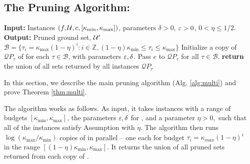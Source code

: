 \subsection{The Pruning Algorithm: \qs} \label{sec:prune-multi} 
\begin{algorithm}[t]
	\caption{\qs: The Pruning Algorithm.}
	\begin{algorithmic}[1] \label{alg:multi}
          \STATE \textbf{Input:} Instances $(f, \mathcal{U}, c, [\kappa_{\min}, \kappa_{\max}])$,  parameters $\delta > 0$, $\varepsilon > 0$,
          $0 < \eta \le 1/2$.
		\STATE \textbf{Output:} Pruned ground set, $\mathcal{U}'$
		\STATE $\mathcal B = \{ \tau_i = \kappa_{\max}(1 - \eta )^i : i \in \mathbb Z, (1 - \eta) \kappa_{\min} \le \tau_i \le \kappa_{\max}\}$\label{line:multi-budgets}
                \STATE Initialize a copy of $\mathcal QP_{\tau}$ of \qss for each $\tau \in \mathcal B$, with parameters $\varepsilon, \delta$.
                \STATE Pass $e$ to $\mathcal QP_{\tau}$ for all $\tau \in \mathcal B$.
                \ENDFOR
                \STATE \textbf{return} the union of all sets returned by all instances $\mathcal QP_{\tau}$
	\end{algorithmic}
\end{algorithm}
In this section, we describe the main pruning algorithm \qs (Alg. \ref{alg:multi})
and prove Theorem \ref{thm:multi}. 

The algorithm \qs works as follows. As input, it takes instances with a range of
budgets $[\kappa_{\min}, \kappa_{\max}]$, the parameters $\varepsilon, \delta$ for
\qss, and a parameter $\eta > 0,$ such that all of the instances satisfy
Assumption \nhi with $\eta$. The algorithm then runs $\log ( \kappa_{\max} / \kappa_{\min} )$
copies of \qss in parallel -- one each for budget $\tau_i = \kappa_{max}(1 - \eta )^i$ in the
range $[( 1 - \eta ) \kappa_{\min}, \kappa_{\max} ]$. It returns the union of all pruned sets
returned from each copy of \qss.

